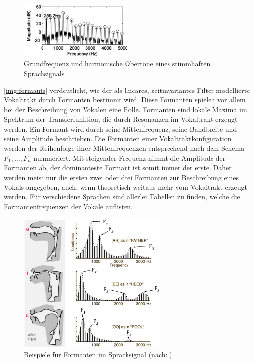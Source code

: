 \begin{figure}[h]
	\centering
	\includegraphics[width=0.5\textwidth]{bilder/pitchPeaks.png}
	\caption[Grundfrequenz und harmonische Obertöne eines stimmhaften Sprachsignals]{Grundfrequenz und harmonische Obertöne eines stimmhaften Sprachsignals \cite{onePitchImage}}
	\label{img:pitchPeaks}
\end{figure}	

\autoref{img:formants} verdeutlicht, wie der als lineares, zeitinvariantes Filter modellierte Vokaltrakt durch Formanten bestimmt wird. Diese Formanten spielen vor allem bei der Beschreibung von Vokalen eine Rolle. Formanten sind lokale Maxima im Spektrum der Transferfunktion, die durch Resonanzen im Vokaltrakt erzeugt werden. Ein Formant wird durch seine Mittenfrequenz, seine Bandbreite und seine Amplitude beschrieben. Die Formanten einer Vokaltraktkonfiguration werden der Reihenfolge ihrer Mittenfrequenzen entsprechend nach dem Schema $F_1 , \ldots , F_n$ nummeriert.  Mit steigender Frequenz nimmt die Amplitude der Formanten ab, der dominanteste Formant ist somit immer der erste. Daher werden meist nur die ersten zwei oder drei Formanten zur Beschreibung eines Vokals angegeben, auch, wenn theoretisch weitaus mehr vom Vokaltrakt erzeugt werden. Für verschiedene Sprachen sind allerlei Tabellen zu finden, welche die Formantenfrequenzen der Vokale auflisten.\cite[S. 19]{sprachverarbeitung}

\begin{figure}[h]
	\centering
	\includegraphics[width=0.65\textwidth]{bilder/formants03.png}
	\caption[Beispiele für Formanten im Sprachsignal]{Beispiele für Formanten im Sprachsignal (nach: \cite{benade})}
	\label{img:formants}
\end{figure}

